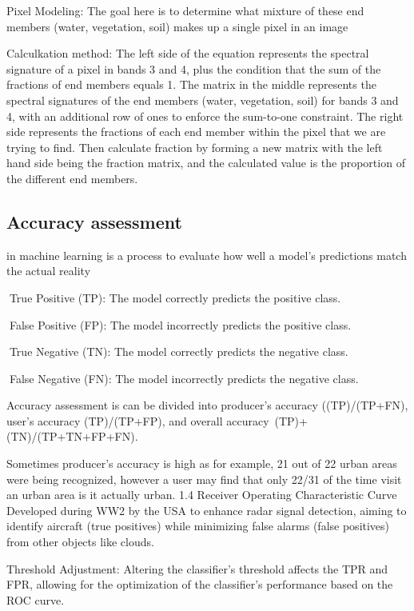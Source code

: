 \documentclass[
  letterpaper,
  DIV=11,
  numbers=noendperiod]{scrreprt}
\begin{document}
Pixel Modeling: The goal here is to determine what mixture of these end
members (water, vegetation, soil) makes up a single pixel in an image

Calculkation method: The left side of the equation represents the
spectral signature of a pixel in bands 3 and 4, plus the condition that
the sum of the fractions of end members equals 1. The matrix in the
middle represents the spectral signatures of the end members (water,
vegetation, soil) for bands 3 and 4, with an additional row of ones to
enforce the sum-to-one constraint. The right side represents the
fractions of each end member within the pixel that we are trying to
find. Then calculate fraction by forming a new matrix with the left hand
side being the fraction matrix, and the calculated value is the
proportion of the different end members.

\subsection{Accuracy assessment}\label{accuracy-assessment}

in machine learning is a process to evaluate how well a model's
predictions match the actual reality

True Positive (TP): The model correctly predicts the positive class.

False Positive (FP): The model incorrectly predicts the positive class.

True Negative (TN): The model correctly predicts the negative class.

False Negative (FN): The model incorrectly predicts the negative class.

Accuracy assessment is can be divided into producer's accuracy
((TP)/(TP+FN), user's accuracy (TP)/(TP+FP), and overall
accuracy~(TP)+(TN)/(TP+TN+FP+FN).

Sometimes producer's accuracy is high as for example, 21 out of 22 urban
areas were being recognized, however a user may find that only 22/31 of
the time visit an urban area is it actually urban. 1.4 Receiver
Operating Characteristic Curve Developed during WW2 by the USA to
enhance radar signal detection, aiming to identify aircraft (true
positives) while minimizing false alarms (false positives) from other
objects like clouds.

Threshold Adjustment: Altering the classifier's threshold affects the
TPR and FPR, allowing for the optimization of the classifier's
performance based on the ROC curve.
\end{document}
